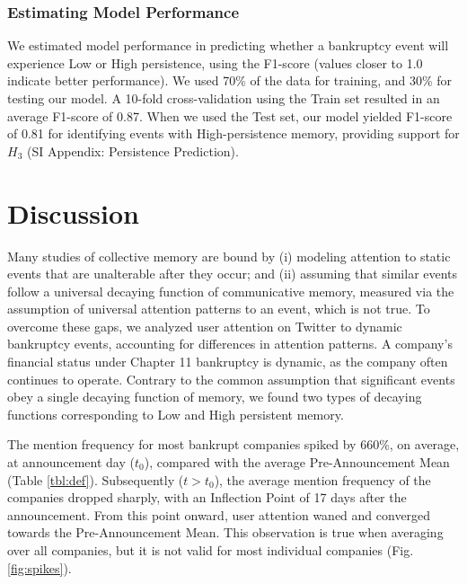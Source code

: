 \documentclass[9pt,twocolumn,twoside,lineno]{pnas-new}
\begin{document}
\subsubsection*{Estimating Model Performance}
We estimated model performance in predicting whether a bankruptcy event will experience Low or High persistence, using the F1-score (values closer to 1.0 indicate better performance).
We used 70\% of the data for training, and 30\% for testing our model.
A 10-fold cross-validation using the Train set resulted in an average F1-score of 0.87.
When we used the Test set, our model yielded F1-score of 0.81 for identifying events with High-persistence memory, providing support for $H_3$ (SI Appendix: Persistence Prediction).


\section*{Discussion}
\label{sec:discussion}
Many studies of collective memory are bound by 
(i) modeling attention to static events that are unalterable after they occur; and
(ii) assuming that similar events follow a universal decaying function of communicative memory, measured via the assumption of universal attention patterns to an event, which is not true.
To overcome these gaps, we analyzed user attention on Twitter to dynamic bankruptcy events, accounting for differences in attention patterns.
A company’s financial status under Chapter 11 bankruptcy is dynamic, as the company often continues to operate.
Contrary to the common assumption that significant events obey a single decaying function of memory, we found two types of decaying functions corresponding to Low and High persistent memory.

The mention frequency for most bankrupt companies spiked by 660\%, on average, at announcement day ($t_0$), compared with the average Pre-Announcement Mean (Table \ref{tbl:def}).
Subsequently ($t>t_0$), the average mention frequency of the companies dropped sharply, with an Inflection Point of 17 days after the announcement.
From this point onward, user attention waned and converged towards the Pre-Announcement Mean.
This observation is true when averaging over all companies, but it is not valid for most individual companies (Fig. \ref{fig:spikes}).
\end{document}
